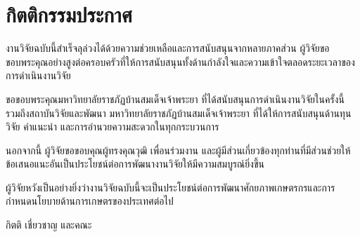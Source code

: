 \chapter*{กิตติกรรมประกาศ}


งานวิจัยฉบับนี้สำเร็จลุล่วงได้ด้วยความช่วยเหลือและการสนับสนุนจากหลายภาคส่วน ผู้วิจัยขอขอบพระคุณอย่างสูงต่อครอบครัวที่ให้การสนับสนุนทั้งด้านกำลังใจและความเข้าใจตลอดระยะเวลาของการดำเนินงานวิจัย

ขอขอบพระคุณมหาวิทยาลัยราชภัฏบ้านสมเด็จเจ้าพระยา ที่ได้สนับสนุนการดำเนินงานวิจัยในครั้งนี้ รวมถึงสถาบันวิจัยและพัฒนา มหาวิทยาลัยราชภัฏบ้านสมเด็จเจ้าพระยา ที่ได้ให้การสนับสนุนด้านทุนวิจัย คำแนะนำ และการอำนวยความสะดวกในทุกกระบวนการ

นอกจากนี้ ผู้วิจัยขอขอบคุณผู้ทรงคุณวุฒิ เพื่อนร่วมงาน และผู้มีส่วนเกี่ยวข้องทุกท่านที่มีส่วนช่วยให้ข้อเสนอแนะอันเป็นประโยชน์ต่อการพัฒนางานวิจัยให้มีความสมบูรณ์ยิ่งขึ้น

ผู้วิจัยหวังเป็นอย่างยิ่งว่างานวิจัยฉบับนี้จะเป็นประโยชน์ต่อการพัฒนาศักยภาพเกษตรกรและการกำหนดนโยบายด้านการเกษตรของประเทศต่อไป

\vspace{1cm}

\begin{flushright}
กิตติ เชี่ยวชาญ และคณะ
\end{flushright}